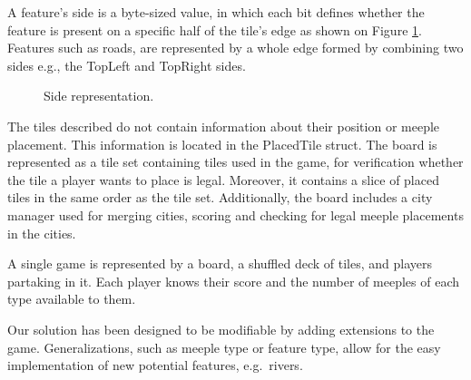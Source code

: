 A feature's side is a byte-sized value, in which each bit defines whether the feature is present on a specific half of the tile's edge as shown on Figure \ref{fig:SIDES}. Features such as roads, are represented by a whole edge formed by combining two sides e.g., the TopLeft and TopRight sides.
\begin{figure}
    \centering
    \caption{Side representation.}
    \label{fig:SIDES}
\end{figure}

The tiles described do not contain information about their position or meeple placement. This information is located in the PlacedTile struct. The board is represented as a tile set containing tiles used in the game, for verification whether the tile a player wants to place is legal. Moreover, it contains a slice of placed tiles in the same order as the tile set. Additionally, the board includes a city manager used for merging cities, scoring and checking for legal meeple placements in the cities.

A single game is represented by a board, a shuffled deck of tiles, and players partaking in it. Each player knows their score and the number of meeples of each type available to them.

Our solution has been designed to be modifiable by adding extensions to the game. Generalizations, such as meeple type or feature type, allow for the easy implementation of new potential features, e.g.\ rivers.

